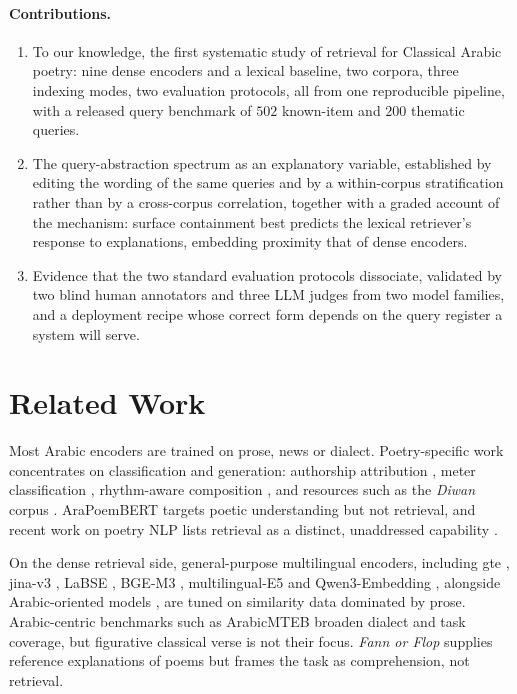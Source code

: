 \documentclass[11pt]{article}
\begin{document}
\paragraph{Contributions.}
\begin{enumerate}[noitemsep,topsep=2pt,leftmargin=1.4em]
\item To our knowledge, the first systematic study of retrieval for Classical Arabic poetry: nine dense encoders and a lexical baseline, two corpora, three indexing modes, two evaluation protocols, all from one reproducible pipeline, with a released query benchmark of $502$ known-item and $200$ thematic queries.
\item The query-abstraction spectrum as an explanatory variable, established by editing the wording of the same queries and by a within-corpus stratification rather than by a cross-corpus correlation, together with a graded account of the mechanism: surface containment best predicts the lexical retriever's response to explanations, embedding proximity that of dense encoders.
\item Evidence that the two standard evaluation protocols dissociate, validated by two blind human annotators and three LLM judges from two model families, and a deployment recipe whose correct form depends on the query register a system will serve.
\end{enumerate}

\section{Related Work}
\label{sec:related}

Most Arabic encoders \citep{antoun-etal-2020-arabert,abdul-mageed-etal-2021-arbert,inoue-etal-2021-interplay} are trained on prose, news or dialect. Poetry-specific work concentrates on classification and generation: authorship attribution \citep{alqurashi-etal-2025-bert}, meter classification \citep{mutawa2025meter}, rhythm-aware composition \citep{elzohbi2025tahdib}, and resources such as the \textit{Diwan} corpus \citep{alonazi2025diwan}. AraPoemBERT \citep{qarah2024arapoembert} targets poetic understanding but not retrieval, and recent work on poetry NLP lists retrieval as a distinct, unaddressed capability \citep{chalamalasetti2025metricalargs}.

On the dense retrieval side, general-purpose multilingual encoders, including gte \citep{li2023gte,zhang2024mgte}, jina-v3 \citep{sturua2024jina}, LaBSE \citep{feng-etal-2022-labse}, BGE-M3 \citep{chen2024bgem3}, multilingual-E5 \citep{wang2024multilinguale5} and Qwen3-Embedding \citep{zhang2025qwen3embedding}, alongside Arabic-oriented models \citep{silma2024embedding,muffakir2025embedding}, are tuned on similarity data dominated by prose. Arabic-centric benchmarks such as ArabicMTEB \citep{bhatia2024swan} broaden dialect and task coverage, but figurative classical verse is not their focus. \textit{Fann or Flop} \citep{alghallabi2025fannorflop} supplies reference explanations of poems but frames the task as comprehension, not retrieval.
\end{document}
